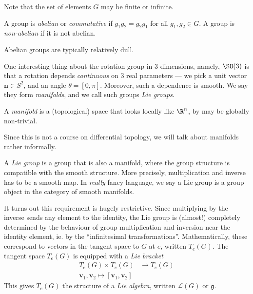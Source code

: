 \documentclass[a4paper]{article}
\begin{document}
Note that the set of elements $G$ may be finite or infinite.
\begin{defi}
  A group is \emph{abelian} or \emph{commutative} if $g_1 g_2 = g_2 g_1$ for all $g_1, g_2 \in G$. A group is \emph{non-abelian} if it is not abelian.
\end{defi}
Abelian groups are typically relatively dull.

One interesting thing about the rotation group in 3 dimensions, namely, $\SO(3)$ is that a rotation depends \emph{continuous} on 3 real parameters --- we pick a unit vector $\mathbf{n} \in S^2$, and an angle $\theta = [0, \pi]$. Moreover, such a dependence is smooth. We say they form \emph{manifolds}, and we call such groups \emph{Lie groups}.

\begin{defi}[Manifold]
  A \emph{manifold} is a (topological) space that looks locally like $\R^n$, by may be globally non-trivial.
\end{defi}

Since this is not a course on differential topology, we will talk about manifolds rather informally.

\begin{defi}
  A \emph{Lie group} is a group that is also a manifold, where the group structure is compatible with the smooth structure. More precisely, multiplication and inverse has to be a smooth map. In \emph{really} fancy language, we say a Lie group is a group object in the category of smooth manifolds.
\end{defi}

It turns out this requirement is hugely restrictive. Since multiplying by the inverse sends any element to the identity, the Lie group is (almost!) completely determined by the behaviour of group multiplication and inversion near the identity element, ie. by the ``infinitesimal transformations''. Mathematically, these correspond to vectors in the tangent space to $G$ at $e$, written $T_e(G)$. The tangent space $T_e(G)$ is equipped with a \emph{Lie bracket}
\begin{align*}
  T_e(G) \times T_e(G) &\to T_e(G)\\
  \mathbf{v}_1, \mathbf{v}_2 \mapsto [\mathbf{v}_1, \mathbf{v}_2]
\end{align*}
This gives $T_e(G)$ the structure of a \emph{Lie algebra}, written $\mathcal{L}(G)$ or $\mathfrak{g}$.
\end{document}
